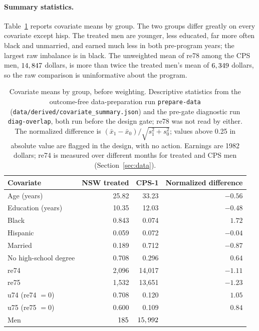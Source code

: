 \documentclass[11pt]{article}
\newcommand{\var}[1]{\texttt{#1}}
\newcommand{\run}[1]{\texttt{#1}}
\begin{document}
\paragraph{Summary statistics.} Table~\ref{tab:summary} reports covariate means by group.
The two groups differ greatly on every covariate except hisp. The treated men are younger,
less educated, far more often black and unmarried, and earned much less in both pre-program
years; the largest raw imbalance is in black. The unweighted mean of re78 among the CPS men,
$14,847$ dollars, is more than twice the treated men's mean of
$6,349$ dollars, so the raw comparison is uninformative about the program.

\begin{table}[tbp]
\centering
\caption{Covariate means by group, before weighting. Descriptive statistics from the
outcome-free data-preparation run \run{prepare-data} (\var{data/derived/covariate\_summary.json})
and the pre-gate diagnostic run \run{diag-overlap}, both run before the design gate; re78 was
not read by either. The normalized difference is $(\bar x_1 - \bar x_0)/\sqrt{s_1^2 + s_0^2}$;
values above 0.25 in absolute value are flagged in the design, with no action. Earnings are
1982 dollars; re74 is measured over different months for treated and CPS men
(Section~\ref{sec:data}).}
\label{tab:summary}
\small
\begin{tabular}{@{}l r r r@{}}
\toprule
Covariate & NSW treated & CPS-1 & Normalized difference \\
\midrule
Age (years) & 25.82 & 33.23 & $-0.56$ \\
Education (years) & 10.35 & 12.03 & $-0.48$ \\
Black & 0.843 & 0.074 & $1.72$ \\
Hispanic & 0.059 & 0.072 & $-0.04$ \\
Married & 0.189 & 0.712 & $-0.87$ \\
No high-school degree & 0.708 & 0.296 & $0.64$ \\
re74 & 2,096 & 14,017 & $-1.11$ \\
re75 & 1,532 & 13,651 & $-1.23$ \\
u74 (re74 $= 0$) & 0.708 & 0.120 & $1.05$ \\
u75 (re75 $= 0$) & 0.600 & 0.109 & $0.84$ \\
\midrule
Men & $185$ & $15,992$ & \\
\bottomrule
\end{tabular}
\end{table}
\end{document}
